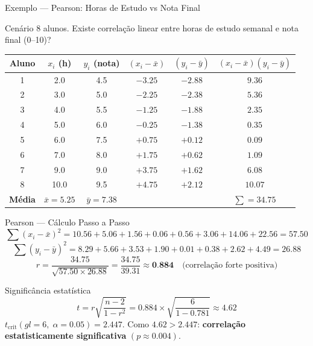 \documentclass[aspectratio=169]{beamer}
\begin{document}
\begin{frame}[shrink=10]{Exemplo — Pearson: Horas de Estudo vs Nota Final}
    \begin{block}{Cenário}
        \footnotesize 8 alunos. Existe correlação linear entre horas de estudo semanal e nota final (0--10)?
    \end{block}
    \pause
    \begin{center}\tiny
    \begin{tabular}{cccccc}
    \toprule
    Aluno & $x_i$ (h) & $y_i$ (nota) & $(x_i-\bar{x})$ & $(y_i-\bar{y})$ & $(x_i-\bar{x})(y_i-\bar{y})$ \\
    \midrule
    1 & 2{.}0  & 4{.}5 & $-3{.}25$ & $-2{.}88$ & $9{.}36$ \\
    2 & 3{.}0  & 5{.}0 & $-2{.}25$ & $-2{.}38$ & $5{.}36$ \\
    3 & 4{.}0  & 5{.}5 & $-1{.}25$ & $-1{.}88$ & $2{.}35$ \\
    4 & 5{.}0  & 6{.}0 & $-0{.}25$ & $-1{.}38$ & $0{.}35$ \\
    5 & 6{.}0  & 7{.}5 & $+0{.}75$ & $+0{.}12$ & $0{.}09$ \\
    6 & 7{.}0  & 8{.}0 & $+1{.}75$ & $+0{.}62$ & $1{.}09$ \\
    7 & 9{.}0  & 9{.}0 & $+3{.}75$ & $+1{.}62$ & $6{.}08$ \\
    8 & 10{.}0 & 9{.}5 & $+4{.}75$ & $+2{.}12$ & $10{.}07$ \\
    \midrule
    \textbf{Média} & $\bar{x}=5{.}25$ & $\bar{y}=7{.}38$ & & & $\sum = 34{.}75$ \\
    \bottomrule
    \end{tabular}
    \end{center}
\end{frame}

\begin{frame}{Pearson — Cálculo Passo a Passo}
    \footnotesize
    \[
      \sum(x_i-\bar{x})^2 = 10{.}56+5{.}06+1{.}56+0{.}06+0{.}56+3{.}06+14{.}06+22{.}56 = 57{.}50
    \]
    \pause
    \[
      \sum(y_i-\bar{y})^2 = 8{.}29+5{.}66+3{.}53+1{.}90+0{.}01+0{.}38+2{.}62+4{.}49 = 26{.}88
    \]
    \pause
    \[
      r = \frac{34{.}75}{\sqrt{57{.}50 \times 26{.}88}}
        = \frac{34{.}75}{39{.}31}
        \approx \mathbf{0{.}884} \quad \text{(correlação forte positiva)}
    \]
    \pause
    \begin{block}{Significância estatística}
        \footnotesize
        \[
          t = r\sqrt{\frac{n-2}{1-r^2}} = 0{.}884 \times \sqrt{\frac{6}{1-0{.}781}} \approx 4{.}62
        \]
        $t_{\text{crit}}(gl=6,\;\alpha=0{.}05) = 2{.}447$. Como $4{.}62 > 2{.}447$: \textbf{correlação estatisticamente significativa} $(p \approx 0{.}004)$.
    \end{block}
\end{frame}
\end{document}
